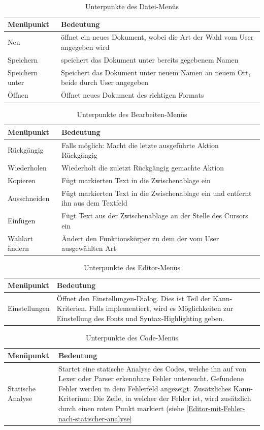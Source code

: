 \documentclass[a4paper]{scrreprt}
\begin{document}
\begin{table}[H]
\begin{tabular}{|p{3cm}|p{12cm}|}
Menüpunkt & Bedeutung \\
\hline
Neu & öffnet ein neues Dokument, wobei die Art der Wahl vom User angegeben wird \\
Speichern & speichert das Dokument unter bereits gegebenem Namen \\
Speichern unter & Speichert das Dokument unter neuem Namen an neuem Ort, beide durch User angegeben \\
Öffnen & Öffnet neues Dokument des richtigen Formats
\end{tabular}
\label{Datei-Menüpunkte}
\caption{Unterpunkte des Datei-Menüs}
\end{table}

\begin{table}[H]
\begin{tabular}{|p{3cm}|p{12cm}|}
Menüpunkt & Bedeutung \\
\hline
Rückgängig & Falls möglich: Macht die letzte ausgeführte Aktion Rückgängig \\
Wiederholen & Wiederholt die zuletzt Rückgängig gemachte Aktion \\
Kopieren & Fügt markierten Text in die Zwischenablage ein \\
Ausschneiden & Fügt markierten Text in die Zwischenablage ein und entfernt ihn aus dem Textfeld \\
Einfügen & Fügt Text aus der Zwischenablage an der Stelle des Cursors ein \\
Wahlart ändern & Ändert den Funktionskörper zu dem der vom User ausgewählten Art
\end{tabular}
\label{Bearbeiten-Menüpunkte}
\caption{Unterpunkte des Bearbeiten-Menüs}
\end{table}

\begin{table}[H]
\begin{tabular}{|p{3cm}|p{12cm}|}
Menüpunkt & Bedeutung \\
\hline
Einstellungen & Öffnet den Einstellungen-Dialog. Dies ist Teil der Kann-Kriterien. Falls implementiert, wird es Möglichkeiten zur Einstellung des Fonts und Syntax-Highlighting geben.
\end{tabular}
\label{Editor-Menüpunkte}
\caption{Unterpunkte des Editor-Menüs}
\end{table}

\begin{table}[H]
\begin{tabular}{|p{3cm}|p{12cm}|}
Menüpunkt & Bedeutung \\
\hline
Statische Analyse & Startet eine statische Analyse des Codes, welche ihn auf von Lexer oder Parser erkennbare Fehler untersucht. Gefundene Fehler werden in dem Fehlerfeld angezeigt. Zusätzliches Kann-Kriterium: Die Zeile, in welcher der Fehler ist, wird zusätzlich durch einen roten Punkt markiert (siehe \ref{Editor-mit-Fehler-nach-statischer-analyse}
\end{tabular}
\label{Editor-Menüpunkte}
\caption{Unterpunkte des Code-Menüs}
\end{table}
\end{document}

